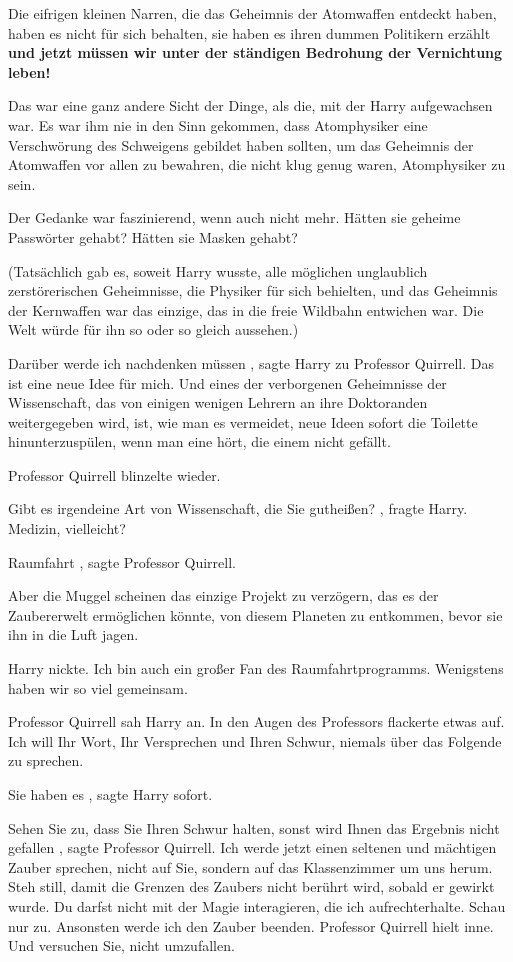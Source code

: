 Die eifrigen kleinen Narren, die das Geheimnis der Atomwaffen entdeckt haben,
haben es nicht für sich behalten, sie haben es ihren dummen Politikern erzählt
\textbf{und jetzt müssen wir unter der ständigen Bedrohung der Vernichtung
leben!}\grqq{}

Das war eine ganz andere Sicht der Dinge, als die, mit der Harry aufgewachsen
war. Es war ihm nie in den Sinn gekommen, dass Atomphysiker eine Verschwörung
des Schweigens gebildet haben sollten, um das Geheimnis der Atomwaffen vor allen
zu bewahren, die nicht klug genug waren, Atomphysiker zu sein.

Der Gedanke war faszinierend, wenn auch nicht mehr. Hätten sie geheime
Passwörter gehabt? Hätten sie Masken gehabt?

(Tatsächlich gab es, soweit Harry wusste, alle möglichen unglaublich
zerstörerischen Geheimnisse, die Physiker für sich behielten, und das Geheimnis
der Kernwaffen war das einzige, das in die freie Wildbahn entwichen war. Die
Welt würde für ihn so oder so gleich aussehen.)

\glqq Darüber werde ich nachdenken müssen\grqq{} , sagte Harry zu Professor
Quirrell. \glqq Das ist eine neue Idee für mich. Und eines der verborgenen
Geheimnisse der Wissenschaft, das von einigen wenigen Lehrern an ihre
Doktoranden weitergegeben wird, ist, wie man es vermeidet, neue Ideen sofort die
Toilette hinunterzuspülen, wenn man eine hört, die einem nicht gefällt.\grqq{}

Professor Quirrell blinzelte wieder.

\glqq Gibt es irgendeine Art von Wissenschaft, die Sie gutheißen?\grqq{} ,
fragte Harry. \glqq Medizin, vielleicht?\grqq{}

\glqq Raumfahrt\grqq{} , sagte Professor Quirrell.

\glqq Aber die Muggel scheinen das einzige Projekt zu verzögern, das es der
Zaubererwelt ermöglichen könnte, von diesem Planeten zu entkommen, bevor sie ihn
in die Luft jagen.\grqq{}

Harry nickte. \glqq Ich bin auch ein großer Fan des Raumfahrtprogramms.
Wenigstens haben wir so viel gemeinsam.\grqq{}

Professor Quirrell sah Harry an. In den Augen des Professors flackerte etwas
auf. \glqq Ich will Ihr Wort, Ihr Versprechen und Ihren Schwur, niemals über das
Folgende zu sprechen.\grqq{}

\glqq Sie haben es\grqq{} , sagte Harry sofort.

\glqq Sehen Sie zu, dass Sie Ihren Schwur halten, sonst wird Ihnen das Ergebnis
nicht gefallen\grqq{} , sagte Professor Quirrell. \glqq Ich werde jetzt einen
seltenen und mächtigen Zauber sprechen, nicht auf Sie, sondern auf das
Klassenzimmer um uns herum. Steh still, damit die Grenzen des Zaubers nicht
berührt wird, sobald er gewirkt wurde. Du darfst nicht mit der Magie
interagieren, die ich aufrechterhalte. Schau nur zu. Ansonsten werde ich den
Zauber beenden.\grqq{} Professor Quirrell hielt inne. \glqq Und versuchen Sie,
nicht umzufallen.\grqq{}

